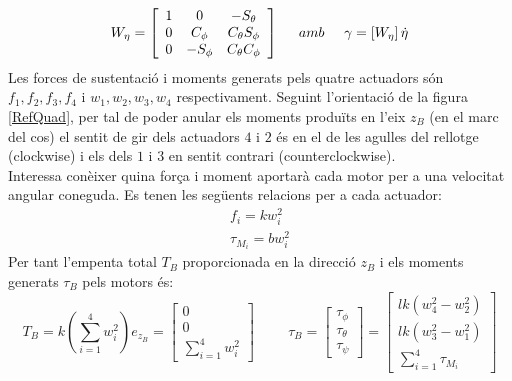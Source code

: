 \documentclass[twoside]{article}
\begin{document}
\begin{equation}
W_\eta=\left[\begin{array}{ccc}
1 & 0 & -S_\theta \\
0 & C_\phi & C_\theta S_\phi \\
0 & -S_\phi & C_\theta C_\phi 
\end{array} \right] \hspace{0.5cm} amb \hspace{0.5cm} 
\gamma=\left[ W_\eta \right] \dot{\eta} 
\end{equation}
Les forces de sustentació i moments generats pels quatre actuadors són $f_1,f_2,f_3,f_4$ i $w_1,w_2,w_3,w_4$ respectivament. Seguint l'orientació de la figura \ref{RefQuad}, per tal de poder anular els moments produïts en l'eix $z_B$ (en el marc del cos) el sentit de gir dels actuadors  $4$ i $2$ és en el de les agulles del rellotge (clockwise) i els dels $1$ i $3$ en sentit contrari (counterclockwise). \\

Interessa conèixer quina força i moment aportarà cada motor per a una velocitat angular coneguda. Es tenen les següents relacions per a cada actuador: 
\begin{equation}
\begin{array}{l}
f_i=kw^2_i \\ 
\tau_{M_i}=bw^2_i
\end{array}
\end{equation}
Per tant l'empenta total $T_B$ proporcionada en la direcció $z_B$ i els moments generats $\tau_B$ pels motors és:
\begin{equation}
T_B=k\left(\sum_{i=1}^{4}w^2_i \right)e_{z_B}=\left[ \begin{array}{c}
0 \\
0 \\
\displaystyle\sum_{i=1}^{4}w^2_i
\end{array} \right] 
\hspace{1cm} \tau_B=\left[ \begin{array}{c}
\tau_\phi \\
\tau_\theta \\
\tau_\psi
\end{array} \right] = \left[ \begin{array}{c}
lk(w^2_4 - w^2_2) \\
lk(w^2_3 - w^2_1) \\
\displaystyle\sum_{i=1}^{4}\tau_{M_i}
\end{array} \right]
\end{equation}
\end{document}
